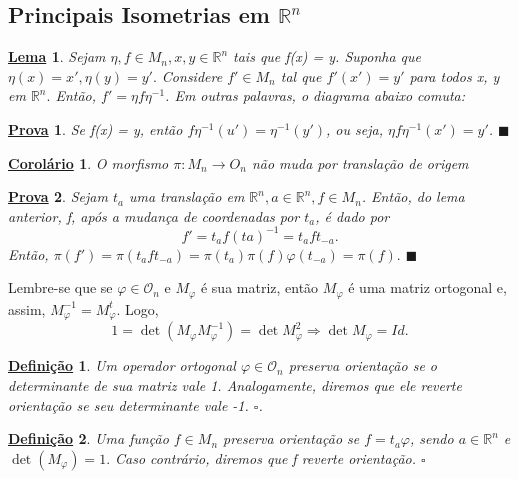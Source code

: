 \documentclass{article}
\newtheorem*{def*}{\underline{Defini\c c\~ao}}
\newtheorem*{crl*}{\underline{Corol\'ario}}
\newtheorem*{proof*}{\underline{Prova}}
\newtheorem*{lemma*}{\underline{Lema}}
\renewcommand\qedsymbol{$\blacksquare$}
\begin{document}
\subsection{Principais Isometrias em $\mathbb{R}^{n}$}
\begin{lemma*}
  Sejam $\eta, f\in M_{n}, x, y\in \mathbb{R}^{n}$ tais que f(x) = y. Suponha que $\eta(x) = x', \eta(y) = y'.$
Considere $f'\in M_{n}$ tal que $f'(x')=y'$ para todos x, y em $\mathbb{R}^{n}.$ Ent\~ao, $f' = \eta f\eta^{-1}$.
  Em outras palavras, o diagrama abaixo comuta: 
\begin{center}
\end{center}
\end{lemma*}
\begin{proof*}
  Se f(x) = y, ent\~ao $f\eta ^{-1}(u') = \eta ^{-1}(y')$, ou seja, $\eta f\eta ^{-1}(x')=y'$. \qedsymbol
\end{proof*}
\begin{crl*}
  O morfismo $\pi :M_{n}\rightarrow O_{n}$ n\~ao muda por transla\c c\~ao de origem
\end{crl*}
\begin{proof*}
  Sejam $t_{a}$ uma translação em $\mathbb{R}^{n}, a\in \mathbb{R}^{n}, f\in M_{n}$. Então, do lema anterior, f,
  após a mudança de coordenadas por $t_{a}$, é dado por 
    $$
      f'=t_{a}f(ta)^{-1} = t_{a}ft_{-a}.
    $$
    Então, $\pi (f') = \pi (t_{a}ft_{-a}) = \pi (t_{a})\pi (f)\varphi (t_{-a}) = \pi (f).$ \qedsymbol
\end{proof*}
  Lembre-se que se $\varphi \in \mathcal{O}_{n}$ e $M_{\varphi }$ é sua matriz, então $M_{\varphi }$ é uma matriz ortogonal e,
  assim, $M_{\varphi }^{-1} = M_{\varphi }^{t}.$ Logo, 
    $$
    1 = \det{(M_{\varphi }M_{\varphi }^{-1})} = \det{M_{\varphi }^{2}} \Rightarrow \det{M_{\varphi }} = Id.
    $$
   \begin{def*}
     Um operador ortogonal $\varphi \in \mathcal{O}_{n}$ preserva orientação se o determinante de sua matriz vale 1. Analogamente,
     diremos que ele reverte orientação se seu determinante vale -1. $\square$.
   \end{def*}
   \begin{def*}
     Uma função $f\in M_{n}$ preserva orientação se $f=t_{a}\varphi $, sendo $a\in \mathbb{R}^{n}$ e $\det{(M_{\varphi })} = 1.$
     Caso contrário, diremos que f reverte orientação. $\square$
   \end{def*}
\end{document}
